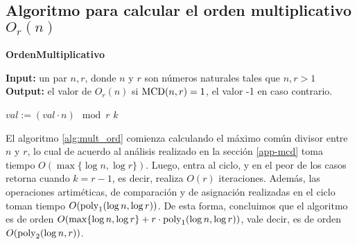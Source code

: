\subsection{Algoritmo para calcular el orden multiplicativo $O_r(n)$}
\label{app-orden_multiplicativo}
\begin{algorithm}[H]
\caption{\quad\textbf{OrdenMultiplicativo}}
\label{alg:mult_ord}
\hspace*{\algorithmicindent} \textbf{Input:} un par $n,r$, donde $n$ y $r$ son números naturales tales que $n,r > 1$\\
\hspace*{\algorithmicindent} \textbf{Output:} el valor de $O_r(n)$ si ${\rm MCD} (n,r) = 1$, el valor -1 en caso contrario.
\begin{algorithmic}[1]
   	\ENDIF
   			\STATE $\textit{val} := (val\cdot n)\mod r$
   				\RETURN $k$
   			\ENDIF
   	\ENDFOR
   			
\end{algorithmic}
\end{algorithm}
El algoritmo \ref{alg:mult_ord} comienza calculando el máximo común divisor entre $n$ y $r$, lo cual de acuerdo al análisis realizado en la sección \ref{app-mcd} toma tiempo $O(\max\{\log n, \log r\})$. Luego, entra al ciclo, y en el peor de los casos retorna cuando $k = r-1$, es decir, realiza $O(r)$ iteraciones. 
Además, las operaciones artiméticas, de comparación y de asignación realizadas en el ciclo toman tiempo $O({\rm poly}_1(\log n, \log r))$. De esta forma, 
concluimos que el algoritmo es de orden $O(\max\{\log n, \log r\} + r \cdot {\rm poly}_1(\log n, \log r))$, vale decir, es de orden~$O({\rm poly}_2(\log n, r))$. 

